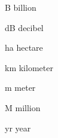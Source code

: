 
\begin{Nomencl}[3cm]
	\item[B] 		billion
	\item[dB] 		decibel
	\item[ha]	 	hectare
	\item[km] 		kilometer
	\item[m] 		meter
	\item[M] 		million
	\item[yr] 		year
\end{Nomencl}
\clearpage
